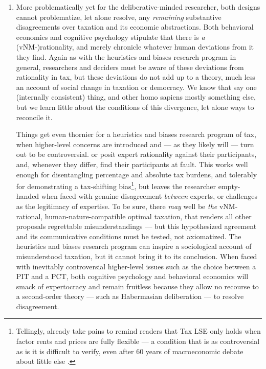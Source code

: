 \begin{enumerate}
	\item More problematically yet for the deliberative-minded researcher, both designs cannot problematize, let alone resolve, any \emph{remaining} substantive disagreements over taxation and its economic abstractions.
	Both behavioral economics and cognitive psychology stipulate that there is \emph{a} (\gls{vNM}-)rationality, and merely chronicle whatever human deviations from it they find.
	Again as with the heuristics and biases research program in general, researchers and deciders must be aware of these deviations from rationality in tax, but these deviations do not add up to a theory, much less an account of social change in taxation or democracy.
	We know that \citeauthor{VonNeumannMorgenstern1944} say one (internally consistent) thing, and other homo sapiens mostly something else, but we learn little about the conditions of this divergence, let alone ways to reconcile it.
	
	Things get even thornier for a heuristics and biases research program of tax, when higher-level concerns are introduced and --- as they likely will --- turn out to be controversial. 
	\citeauthor{McCafferyBaron2004} or \citeauthor{SausgruberTyran2011} posit expert rationality against their participants, and, whenever they differ, find their participants at fault.
	This works well enough for disentangling percentage and absolute tax burdens, and tolerably for demonstrating a tax-shifting bias\footnote{
	Tellingly, \citeauthor{SausgruberTyran2011} already take pains to remind readers that \gls{Tax LSE} only holds when factor rents and prices are fully flexible --- a condition that is as controversial as is it is difficult to verify, even after 60 years of macroeconomic debate about little else \citep{Wapshott2011}.},
but leaves the researcher empty-handed when faced with genuine disagreement \emph{between} experts, or challenges as the legitimacy of expertise.
	To be sure, there \emph{may} well be \emph{the} \gls{vNM}-rational, human-nature-compatible optimal taxation, that renders all other proposals regrettable misunderstandings --- but this hypothesized agreement and its communicative conditions must be tested, not axiomatized.
	The heuristics and biases research program can inspire a sociological account of misunderstood taxation, but it cannot bring it to its conclusion.
	When faced with inevitably controversial higher-level issues such as the choice between a \gls{PIT} and a \gls{PCT}, both cognitive psychology and behavioral economics will smack of expertocracy and remain fruitless because they allow no recourse to a second-order theory \citep[125]{GutmannThompson-2004-aa} --- such as Habermasian deliberation --- to resolve disagreement.	 
\end{enumerate}


